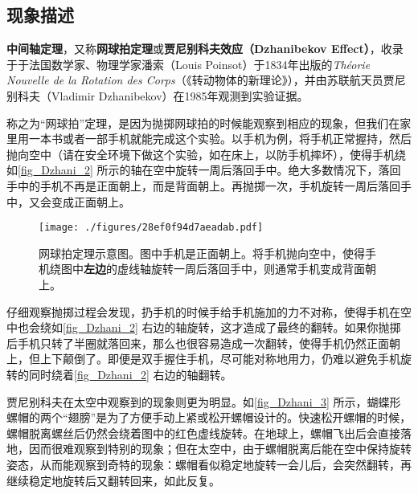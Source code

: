 



\subsection{现象描述}


\textbf{中间轴定理}，又称\textbf{网球拍定理}或\textbf{贾尼别科夫效应（Dzhanibekov Effect）}，收录于于法国数学家、物理学家潘索（Louis Poinsot）于1834年出版的\textsl{Théorie Nouvelle de la Rotation des Corps}（《转动物体的新理论》），并由苏联航天员贾尼别科夫（Vladimir Dzhanibekov）在1985年观测到实验证据。


称之为“网球拍”定理，是因为抛掷网球拍的时候能观察到相应的现象，但我们在家里用一本书或者一部手机就能完成这个实验。以手机为例，将手机正常握持，然后抛向空中（请在安全环境下做这个实验，如在床上，以防手机摔坏），使得手机绕如\autoref{fig_Dzhani_2} 所示的轴在空中旋转一周后落回手中。绝大多数情况下，落回手中的手机不再是正面朝上，而是背面朝上。再抛掷一次，手机旋转一周后落回手中，又会变成正面朝上。





\begin{figure}[ht]
\centering
\texttt{[image: ./figures/28ef0f94d7aeadab.pdf]}
\caption{网球拍定理示意图。图中手机是正面朝上。将手机抛向空中，使得手机绕图中\textbf{左边}的虚线轴旋转一周后落回手中，则通常手机变成背面朝上。} \label{fig_Dzhani_2}
\end{figure}

仔细观察抛掷过程会发现，扔手机的时候手给手机施加的力不对称，使得手机在空中也会绕如\autoref{fig_Dzhani_2} 右边的轴旋转，这才造成了最终的翻转。如果你抛掷后手机只转了半圈就落回来，那么也很容易造成一次翻转，使得手机仍然正面朝上，但上下颠倒了。即便是双手握住手机，尽可能对称地用力，仍难以避免手机旋转的同时绕着\autoref{fig_Dzhani_2} 右边的轴翻转。


贾尼别科夫在太空中观察到的现象则更为明显。如\autoref{fig_Dzhani_3} 所示，蝴蝶形螺帽的两个“翅膀”是为了方便手动上紧或松开螺帽设计的。快速松开螺帽的时候，螺帽脱离螺丝后仍然会绕着图中的红色虚线旋转。在地球上，螺帽飞出后会直接落地，因而很难观察到特别的现象；但在太空中，由于螺帽脱离后能在空中保持旋转姿态，从而能观察到奇特的现象：螺帽看似稳定地旋转一会儿后，会突然翻转，再继续稳定地旋转后又翻转回来，如此反复。


